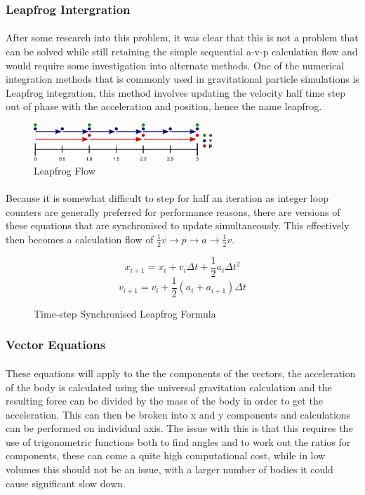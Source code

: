 \subsubsection{Leapfrog Intergration}
\paragraph{}
After some research into this problem, it was clear that this is not a problem that can be solved while still retaining the simple sequential a-v-p calculation flow and would require some investigation into alternate methods. One of the numerical integration methods that is commonly used in gravitational particle simulations is Leapfrog integration, this method involves updating the velocity half time step out of phase with the acceleration and position, hence the name leapfrog.

\begin{figure}[!ht]
  \centering
  \includegraphics[width=0.6\textwidth]{img/leapfrog.png}
  \caption{Leapfrog Flow}
\end{figure}

\paragraph{}
Because it is somewhat difficult to step for half an iteration as integer loop counters are generally preferred for performance reasons, there are versions of these equations that are synchronised to update simultaneously. This effectively then becomes a calculation flow of $\frac{1}{2}v \rightarrow p \rightarrow a \rightarrow \frac{1}{2}v$.

\begin{figure}[!ht]
  $$x_{i+1}=x_i+v_i\Delta{t}+\frac{1}{2}a_i\Delta{t}^2$$
  $$v_{i+1}=v_i+\frac{1}{2}(a_i+a_{i+1})\Delta{t}$$
  \caption{Time-step Synchronised Leapfrog Formula}
\end{figure}

\subsubsection{Vector Equations}
\paragraph{}
These equations will apply to the the components of the vectors, the acceleration of the body is calculated using the universal gravitation calculation and the resulting force can be divided by the mass of the body in order to get the acceleration. This can then be broken into x and y components and calculations can be performed on individual axis. The issue with this is that this requires the use of trigonometric functions both to find angles and to work out the ratios for components, these can come a quite high computational cost, while in low volumes this should not be an issue, with a larger number of bodies it could cause significant slow down.

